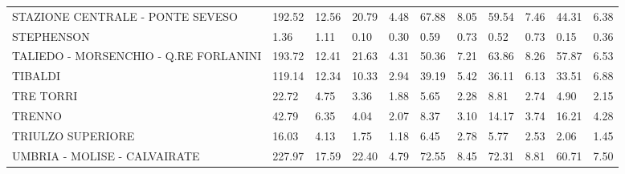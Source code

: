 \begin{table}[H]
{{\begin{tabular}{lp{1.3cm}p{1.3cm}p{1.3cm}p{1.3cm}p{1.3cm}p{1.3cm}p{1.3cm}p{1.3cm}p{1.3cm}p{1.3cm}}
STAZIONE CENTRALE - PONTE SEVESO                   &                    192.52 &                 12.56 &                       20.79 &                    4.48 &                       67.88 &                    8.05 &                       59.54 &                    7.46 &                     44.31 &                  6.38 \\
STEPHENSON                                         &                      1.36 &                  1.11 &                        0.10 &                    0.30 &                        0.59 &                    0.73 &                        0.52 &                    0.73 &                      0.15 &                  0.36 \\
TALIEDO - MORSENCHIO - Q.RE FORLANINI              &                    193.72 &                 12.41 &                       21.63 &                    4.31 &                       50.36 &                    7.21 &                       63.86 &                    8.26 &                     57.87 &                  6.53 \\
TIBALDI                                            &                    119.14 &                 12.34 &                       10.33 &                    2.94 &                       39.19 &                    5.42 &                       36.11 &                    6.13 &                     33.51 &                  6.88 \\
TRE TORRI                                          &                     22.72 &                  4.75 &                        3.36 &                    1.88 &                        5.65 &                    2.28 &                        8.81 &                    2.74 &                      4.90 &                  2.15 \\
TRENNO                                             &                     42.79 &                  6.35 &                        4.04 &                    2.07 &                        8.37 &                    3.10 &                       14.17 &                    3.74 &                     16.21 &                  4.28 \\
TRIULZO SUPERIORE                                  &                     16.03 &                  4.13 &                        1.75 &                    1.18 &                        6.45 &                    2.78 &                        5.77 &                    2.53 &                      2.06 &                  1.45 \\
UMBRIA - MOLISE - CALVAIRATE                       &                    227.97 &                 17.59 &                       22.40 &                    4.79 &                       72.55 &                    8.45 &                       72.31 &                    8.81 &                     60.71 &                  7.50 \\

\end{tabular}}}
\end{table}
